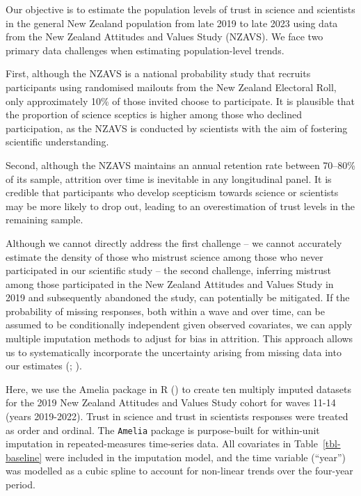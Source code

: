 \documentclass[
  single column]{article}
\begin{document}
Our objective is to estimate the population levels of trust in science
and scientists in the general New Zealand population from late 2019 to
late 2023 using data from the New Zealand Attitudes and Values Study
(NZAVS). We face two primary data challenges when estimating
population-level trends.

First, although the NZAVS is a national probability study that recruits
participants using randomised mailouts from the New Zealand Electoral
Roll, only approximately 10\% of those invited choose to participate. It
is plausible that the proportion of science sceptics is higher among
those who declined participation, as the NZAVS is conducted by
scientists with the aim of fostering scientific understanding.

Second, although the NZAVS maintains an annual retention rate between
70--80\% of its sample, attrition over time is inevitable in any
longitudinal panel. It is credible that participants who develop
scepticism towards science or scientists may be more likely to drop out,
leading to an overestimation of trust levels in the remaining sample.

Although we cannot directly address the first challenge -- we cannot
accurately estimate the density of those who mistrust science among
those who never participated in our scientific study -- the second
challenge, inferring mistrust among those participated in the New
Zealand Attitudes and Values Study in 2019 and subsequently abandoned
the study, can potentially be mitigated. If the probability of missing
responses, both within a wave and over time, can be assumed to be
conditionally independent given observed covariates, we can apply
multiple imputation methods to adjust for bias in attrition. This
approach allows us to systematically incorporate the uncertainty arising
from missing data into our estimates
(;
).

Here, we use the Amelia package in R () to create ten multiply imputed datasets for the
2019 New Zealand Attitudes and Values Study cohort for waves 11-14
(years 2019-2022). Trust in science and trust in scientists responses
were treated as order and ordinal. The \texttt{Amelia} package is
purpose-built for within-unit imputation in repeated-measures
time-series data. All covariates in Table~\ref{tbl-baseline} were
included in the imputation model, and the time variable (``year'') was
modelled as a cubic spline to account for non-linear trends over the
four-year period.
\end{document}
